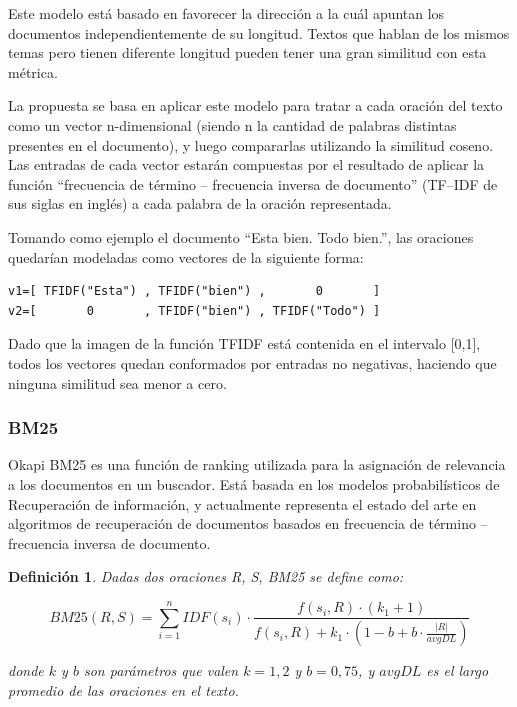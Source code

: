 \documentclass{llncs}
\newtheorem{definicion}{Definición}
\begin{document}
Este modelo está basado en favorecer la dirección a la cuál apuntan los documentos independientemente de su longitud. Textos que hablan de los mismos temas pero tienen diferente longitud pueden tener una gran similitud con esta métrica. 

La propuesta se basa en aplicar este modelo para tratar a cada oración del texto como un vector n-dimensional (siendo n la cantidad de palabras distintas presentes en el documento), y luego compararlas utilizando la similitud coseno. Las entradas de cada vector estarán compuestas por el resultado de aplicar la función “frecuencia de término -- frecuencia inversa de documento” (TF--IDF de sus siglas en inglés) a cada palabra de la oración representada.

Tomando como ejemplo el documento “Esta bien. Todo bien.”, las oraciones quedarían modeladas como vectores de la siguiente forma:

\begin{Verbatim}[xleftmargin=3em]
v1=[ TFIDF("Esta") , TFIDF("bien") ,       0       ]
v2=[       0       , TFIDF("bien") , TFIDF("Todo") ]
\end{Verbatim}

Dado que la imagen de la función TFIDF está contenida en el intervalo [0,1], todos los vectores quedan conformados por entradas no negativas, haciendo que ninguna similitud sea menor a cero. 

\subsubsection{BM25}
Okapi BM25 es una función de ranking utilizada para la asignación de relevancia a los documentos en un buscador. 
Está basada en los modelos probabilísticos de Recuperación de información, y actualmente 
representa el estado del arte en algoritmos de recuperación de documentos basados en frecuencia de término -- frecuencia inversa de documento.

\begin{definicion}
Dadas dos oraciones R, S, BM25 se define como:

\begin{equation}
BM25(R,S) = \sum_{i=1}^{n} IDF(s_i) \cdot \frac{f(s_i, R) \cdot (k_1 + 1)}{f(s_i, R) + k_1 \cdot (1 - b + b \cdot \frac{|R|}{avgDL})}
\end{equation}

donde $k$ y $b$ son parámetros que valen $k = 1,2$ y $b = 0,75$, y $avgDL$ es el largo promedio de las oraciones en el texto.
\end{definicion}
\end{document}
